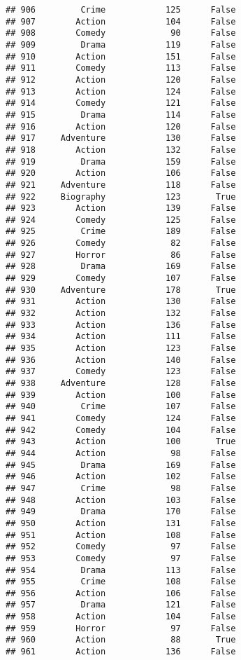 \documentclass[
]{article}
\begin{document}
\begin{verbatim}
## 906         Crime            125      False
## 907        Action            104      False
## 908        Comedy             90      False
## 909         Drama            119      False
## 910        Action            151      False
## 911        Comedy            113      False
## 912        Action            120      False
## 913        Action            124      False
## 914        Comedy            121      False
## 915         Drama            114      False
## 916        Action            120      False
## 917     Adventure            130      False
## 918        Action            132      False
## 919         Drama            159      False
## 920        Action            106      False
## 921     Adventure            118      False
## 922     Biography            123       True
## 923        Action            139      False
## 924        Comedy            125      False
## 925         Crime            189      False
## 926        Comedy             82      False
## 927        Horror             86      False
## 928         Drama            169      False
## 929        Comedy            107      False
## 930     Adventure            178       True
## 931        Action            130      False
## 932        Action            132      False
## 933        Action            136      False
## 934        Action            111      False
## 935        Action            123      False
## 936        Action            140      False
## 937        Comedy            123      False
## 938     Adventure            128      False
## 939        Action            100      False
## 940         Crime            107      False
## 941        Comedy            124      False
## 942        Comedy            104      False
## 943        Action            100       True
## 944        Action             98      False
## 945         Drama            169      False
## 946        Action            102      False
## 947         Crime             98      False
## 948        Action            103      False
## 949         Drama            170      False
## 950        Action            131      False
## 951        Action            108      False
## 952        Comedy             97      False
## 953        Comedy             97      False
## 954         Drama            113      False
## 955         Crime            108      False
## 956        Action            106      False
## 957         Drama            121      False
## 958        Action            104      False
## 959        Horror             97      False
## 960        Action             88       True
## 961        Action            136      False

\end{verbatim}
\end{document}
